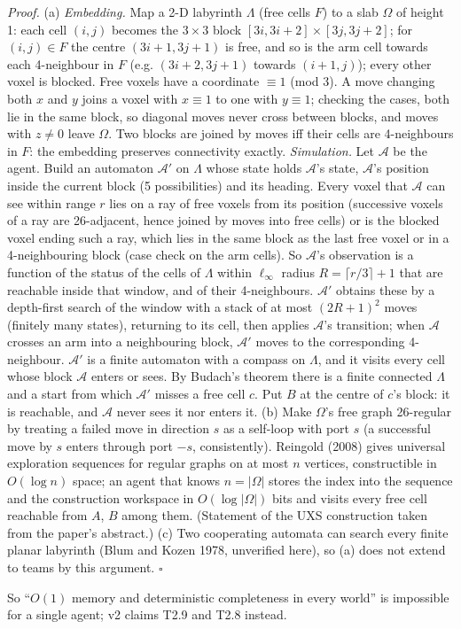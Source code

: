 \documentclass[11pt,a4paper]{article}
\newenvironment{proof}{\par\noindent\textit{Proof.}\enspace\ignorespaces}
  {\leavevmode\unskip\penalty9999\hbox{}\nobreak\hfill\quad\hbox{$\square$}\par\medskip}
\newcommand{\trace}[4]{\par\smallskip\noindent{\small\raggedright\emph{Code} #1\enspace\textperiodcentered\enspace
  \emph{Lean} #2\enspace\textperiodcentered\enspace\emph{Check} #3\enspace\textperiodcentered\enspace\emph{Bench} #4\par}\medskip}
\begin{document}
\begin{proof}
(a) \emph{Embedding.} Map a 2-D labyrinth $\Lambda$ (free cells $F$) to a slab $\Omega$ of height 1: each cell $(i,j)$
becomes the $3\times3$ block $[3i,3i+2]\times[3j,3j+2]$; for $(i,j)\in F$ the centre $(3i+1,3j+1)$ is free, and so is the
arm cell towards each 4-neighbour in $F$ (e.g. $(3i+2,3j+1)$ towards $(i+1,j)$); every other voxel is blocked. Free
voxels have a coordinate $\equiv1$ (mod 3). A move changing both $x$ and $y$ joins a voxel with $x\equiv1$ to one with
$y\equiv1$; checking the cases, both lie in the same block, so diagonal moves never cross between blocks, and moves
with $z\ne0$ leave $\Omega$. Two blocks are joined by moves iff their cells are 4-neighbours in $F$: the embedding
preserves connectivity exactly.
\emph{Simulation.} Let $\mathcal A$ be the agent. Build an automaton $\mathcal A'$ on $\Lambda$ whose state holds
$\mathcal A$'s state, $\mathcal A$'s position inside the current block (5 possibilities) and its heading. Every voxel
that $\mathcal A$ can see within range $r$ lies on a ray of free voxels from its position (successive voxels of a ray
are 26-adjacent, hence joined by moves into free cells) or is the blocked voxel ending such a ray, which lies in the
same block as the last free voxel or in a 4-neighbouring block (case check on the arm cells). So $\mathcal A$'s
observation is a function of the status of the cells of $\Lambda$ within $\ell_\infty$ radius $R=\lceil r/3\rceil+1$ that
are reachable inside that window, and of their 4-neighbours. $\mathcal A'$ obtains these by a depth-first search of
the window with a stack of at most $(2R+1)^2$ moves (finitely many states), returning to its cell, then applies
$\mathcal A$'s transition; when $\mathcal A$ crosses an arm into a neighbouring block, $\mathcal A'$ moves to the
corresponding 4-neighbour. $\mathcal A'$ is a finite automaton with a compass on $\Lambda$, and it visits every cell
whose block $\mathcal A$ enters or sees. By Budach's theorem there is a finite connected $\Lambda$ and a start from
which $\mathcal A'$ misses a free cell $c$. Put $B$ at the centre of $c$'s block: it is reachable, and $\mathcal A$
never sees it nor enters it.
(b) Make $\Omega$'s free graph 26-regular by treating a failed move in direction $s$ as a self-loop with port $s$ (a
successful move by $s$ enters through port $-s$, consistently). Reingold (2008) gives universal exploration
sequences for regular graphs on at most $n$ vertices, constructible in $O(\log n)$ space; an agent that knows
$n=|\Omega|$ stores the index into the sequence and the construction workspace in $O(\log|\Omega|)$ bits and visits
every free cell reachable from $A$, $B$ among them. (Statement of the UXS construction taken from the paper's
abstract.) (c) Two cooperating automata can search every finite planar labyrinth (Blum and Kozen 1978, unverified
here), so (a) does not extend to teams by this argument.
\end{proof}
\noindent So ``$O(1)$ memory and deterministic completeness in every world'' is impossible for a single agent; v2
claims T2.9 and T2.8 instead.
\trace{---}{---}{---}{---}
\end{document}
